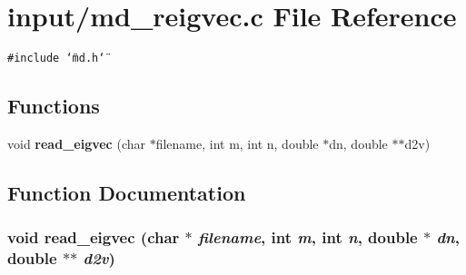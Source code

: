 \section{input/md\_\-reigvec.c File Reference}
\label{md__reigvec_8c}
{\tt \#include \char`\"{}md.h\char`\"{}}\par
\subsection*{Functions}
\begin{CompactItemize}
\item 
void {\bf read\_\-eigvec} (char $\ast$filename, int m, int n, double $\ast$dn, double $\ast$$\ast$d2v)
\end{CompactItemize}


\subsection{Function Documentation}
\subsubsection{\setlength{\rightskip}{0pt plus 5cm}void read\_\-eigvec (char $\ast$ {\em filename}, int {\em m}, int {\em n}, double $\ast$ {\em dn}, double $\ast$$\ast$ {\em d2v})}\label{md__reigvec_8c_4db8b696e9f5b849e508a2488c0ecffd}


